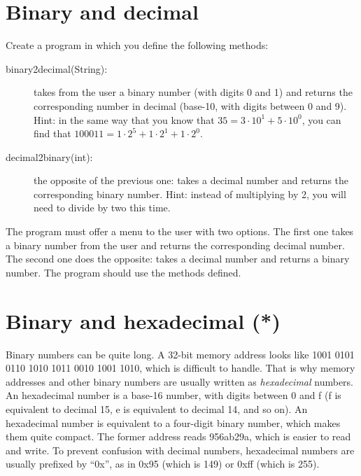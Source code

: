 \documentclass{article}
\begin{document}





\section{Binary and decimal}
\label{sec:from-10011-19}

Create a program in which you define the following methods: 

\begin{description}
\item[binary2decimal(String):] takes from the user a binary number
  (with digits 0 and 1) and returns the corresponding number in
  decimal (base-10, with digits between 0 and 9).  Hint: in the same
  way that you know that $35 = 3 \cdot 10^1 + 5 \cdot 10^0$, you can find that
  $100011 = 1 \cdot 2^5 + 1 \cdot 2^1 + 1 \cdot 2^0$.
\item[decimal2binary(int):] the opposite of the previous one: takes a
  decimal number and returns the corresponding binary number.  Hint:
  instead of multiplying by 2, you will need to divide by two this
  time.
\end{description}

The program must offer a menu to the user with two options. 
The first one takes a binary number from the
user and returns the corresponding decimal number. The second one does
the opposite: takes a decimal number and returns a binary number. The
program should use the methods defined. 

\section{Binary and hexadecimal (*)}
\label{sec:c}

Binary numbers can be quite long. A 32-bit memory address looks like
1001 0101 0110 1010 1011 0010 1001 1010, which is difficult to
handle. That is why memory addresses and other binary numbers are
usually written as \emph{hexadecimal} numbers. An hexadecimal number
is a base-16 number, with digits between 0 and f (f is equivalent to
decimal 15, e is equivalent to decimal 14, and so on). An hexadecimal
number is equivalent to a four-digit binary number, which makes them
quite compact. The former address reads 956ab29a, which is easier to
read and write. To prevent confusion with decimal numbers, hexadecimal
numbers are usually prefixed by ``0x'', as in 0x95 (which is 149) or
0xff (which is 255). 
\end{document}
